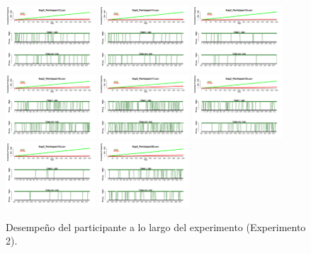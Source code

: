 \begin{figure}[th]
\includegraphics[width=0.30\textwidth]{Figures/Success_Exp2_P13} \includegraphics[width=0.30\textwidth]{Figures/Success_Exp2_P14} \includegraphics[width=0.30\textwidth]{Figures/Success_Exp2_P15}
\includegraphics[width=0.30\textwidth]{Figures/Success_Exp2_P16} \includegraphics[width=0.30\textwidth]{Figures/Success_Exp2_P17} \includegraphics[width=0.30\textwidth]{Figures/Success_Exp2_P18}
\includegraphics[width=0.30\textwidth]{Figures/Success_Exp2_P19} \includegraphics[width=0.30\textwidth]{Figures/Success_Exp2_P20} 
\caption[Success_Exp2]{Desempeño del participante a lo largo del experimento (Experimento 2).}
\label{fig:Success_E2}
\end{figure}


